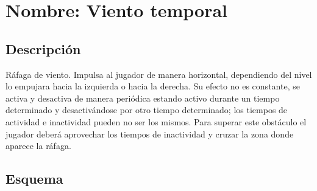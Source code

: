 		\section{Nombre: Viento temporal}\label{obs.vientoT}
	\subsection{Descripción}
	Ráfaga de viento. Impulsa al jugador de manera horizontal, dependiendo del nivel lo empujara hacia la izquierda o hacia la derecha. Su efecto no es constante, se activa y desactiva de manera periódica estando activo durante un tiempo determinado y desactivándose por otro tiempo determinado; los tiempos de actividad e inactividad pueden no ser los mismos. Para superar este obstáculo el jugador deberá aprovechar los tiempos de inactividad y cruzar la zona donde aparece la ráfaga.
	\subsection{Esquema}
